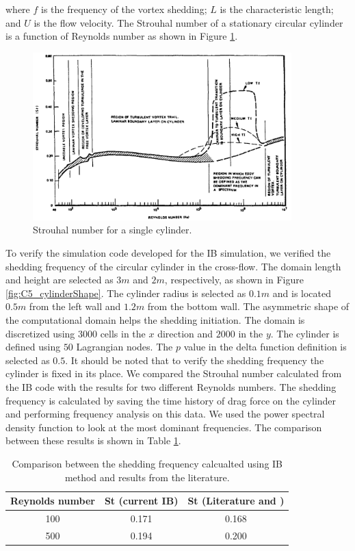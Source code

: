 %
where $f$ is the frequency of the vortex shedding; $L$ is the characteristic length; and $U$ is the flow velocity. The Strouhal number of a stationary circular cylinder is a function of Reynolds number \cite{chen1987flow} as shown in Figure \ref{fig:C5_strouhalVSreynoldsNumber}\cite{jendrzejczyk1985fluid}.
%
\begin{figure}[H]
    \centering
    \includegraphics[width=10.00cm]{Chapter_5/figure/StrouhalVsReynodsl.png}
    \caption{Strouhal number for a single cylinder.}
    \label{fig:C5_strouhalVSreynoldsNumber}
\end{figure}
%
To verify the simulation code developed for the IB simulation, we verified the shedding frequency of the circular cylinder in the cross-flow. The domain length and height are selected as $3 m$ and $2 m$, respectively, as shown in Figure \ref{fig:C5_cylinderShape}. The cylinder radius is selected as $0.1 m$ and is located $0.5 m$ from the left wall and $1.2 m$ from the bottom wall. The asymmetric shape of the computational domain helps the shedding initiation. The domain is discretized using $3000$ cells in the $x$ direction and $2000$ in the $y$. The cylinder is defined using $50$ Lagrangian nodes. The $p$ value in the delta function definition is selected as $0.5$. It should be noted that to verify the shedding frequency the cylinder is fixed in its place. We compared the Strouhal number calculated from the IB code with the results \cite{mittal2001control} for two different Reynolds numbers. The shedding frequency is calculated by saving the time history of drag force on the cylinder and performing frequency analysis on this data. We used the power spectral density function to look at the most dominant frequencies. The comparison between these results is shown in Table \ref{table:C5_strouhalVerification}.
%
\begin{table}[H]
\centering
\begin{tabular}{c | c | c}
     Reynolds number & St (current IB) & St (Literature \cite{jendrzejczyk1985fluid} and \cite{mittal2001control}) \\ \hline \hline
     100 & 0.171 & 0.168 \\ \hline
     500 & 0.194 & 0.200 \\
\end{tabular}
\caption{Comparison between the shedding frequency calcualted using IB method and results from the literature.}
\label{table:C5_strouhalVerification}
\end{table}
